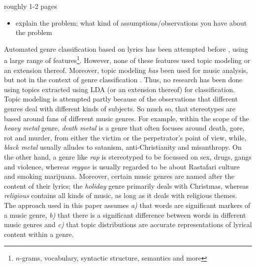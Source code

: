 roughly 1-2 pages
\begin{itemize}
\item explain the problem; what kind of assumptions/observations you have about the problem
\end{itemize}

Automated genre classification based on lyrics has been attempted before \cite{fellyrics}, using a large range of features\footnote{$n$-grams, vocabulary, syntactic structure, semantics and more}. However, none of these features used topic modeling or an extension thereof. Moreover, topic modeling \textit{has} been used for music analysis, but not in the context of genre classification \cite{lukiccomparison}. Thus, no research has been done using topics extracted using LDA (or an extension thereof) for classification. \\
Topic modeling is attempted partly because of the observations that different genres deal with different kinds of subjects. So much so, that stereotypes are based around fans of different music genres. For example, within the scope of the \textit{heavy metal} genre, \textit{death metal} is a genre that often focuses around death, gore, rot and murder, from either the victim or the perpetrator's point of view, while, \textit{black metal} usually alludes to satanism, anti-Christianity and misanthropy. On the other hand, a genre like \textit{rap} is stereotyped to be focussed on sex, drugs, gangs and violence, whereas \textit{reggae} is usually regarded to be about Rastafari culture and smoking marijuana. Moreover, certain music genres are named after the content of their lyrics; the \textit{holiday} genre primarily deals with Christmas, whereas \textit{religious} contains all kinds of music, as long as it deals with religious themes. \\
The approach used in this paper assumes \textit{a)} that words are significant markers of a music genre, \textit{b)} that there is a significant difference between words in different music genres and \textit{c)} that topic distributions are accurate representations of lyrical content within a genre. 